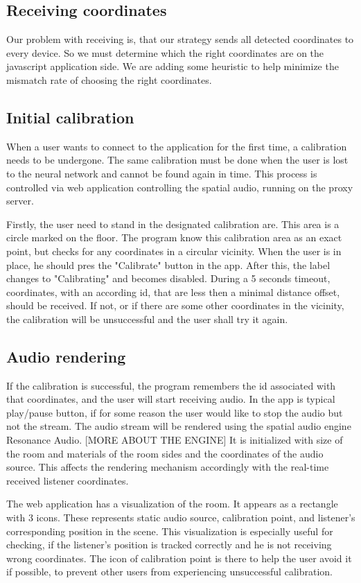 \documentclass{ctuthesis}
\begin{document}
\subsection{Receiving coordinates}
Our problem with receiving is, that our strategy sends all detected coordinates to every device. So we must determine which the right coordinates are on the javascript application side. We are adding some heuristic to help minimize the mismatch rate of choosing the right coordinates.

\subsection{Initial calibration} \label{calibration}
When a user wants to connect to the application for the first time, a calibration needs to be undergone. The same calibration must be done when the user is lost to the neural network and cannot be found again in time. This process is controlled via web application controlling the spatial audio, running on the proxy server.

Firstly, the user need to stand in the designated calibration are. This area is a circle marked on the floor. The program know this calibration area as an exact point, but checks for any coordinates in a circular vicinity. When the user is in place, he should pres the "Calibrate" button in the app. After this, the label changes to "Calibrating" and becomes disabled. During a 5 seconds timeout, coordinates, with an according id, that are less then a minimal distance offset, should be received. If not, or if there are some other coordinates in the vicinity, the calibration will be unsuccessful and the user shall try it again. 

\subsection{Audio rendering}
If the calibration is successful, the program remembers the id associated with that coordinates, and the user will start receiving audio. In the app is typical play/pause button, if for some reason the user would like to stop the audio but not the stream. The audio stream will be rendered using the spatial audio engine Resonance Audio. [MORE ABOUT THE ENGINE] It is initialized with size of the room and materials of the room sides and the coordinates of the audio source. This affects the rendering mechanism accordingly with the real-time received listener coordinates. 

The web application has a visualization of the room. It appears as a rectangle with 3 icons. These represents static audio source, calibration point, and listener's corresponding position in the scene. This visualization is especially useful for checking, if the listener's position is tracked correctly and he is not receiving wrong coordinates. The icon of calibration point is there to help the user avoid it if possible, to prevent other users from experiencing unsuccessful calibration.
\end{document}
